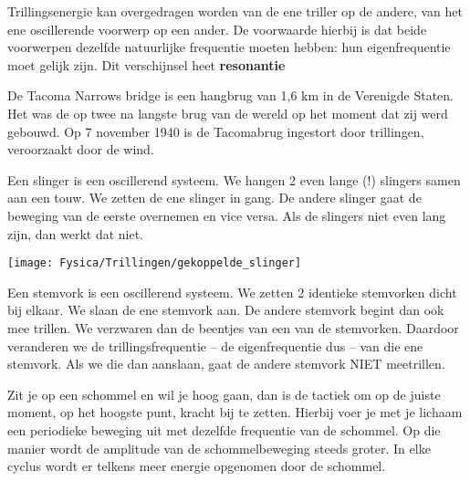 \documentclass{ximera}
\begin{document}
    \author{Ingmar Herreman}
    \date{Maart 2024}


\begin{definition}
Trillingsenergie kan overgedragen worden van de ene triller op de andere, van het ene oscillerende voorwerp op een ander. De voorwaarde hierbij is dat beide voorwerpen dezelfde natuurlijke frequentie moeten hebben: hun eigenfrequentie moet gelijk zijn. Dit verschijnsel heet \textbf{resonantie}
\end{definition}

\begin{example} 
De Tacoma Narrows bridge is een hangbrug van 1,6 km in de Verenigde Staten. Het was de op twee na langste brug van de wereld op het moment dat zij werd gebouwd. Op 7 november 1940 is de Tacomabrug ingestort door trillingen, veroorzaakt door de wind.
\begin{center}
\end{center}
\end{example}

\begin{example} 
Een slinger is een oscillerend systeem. We hangen 2 even lange (!) slingers samen aan een touw.
We zetten de ene slinger in gang. De andere slinger gaat de beweging van de eerste overnemen en vice versa. Als de slingers niet even lang zijn, dan werkt dat niet.
\begin{image}
    \texttt{[image: Fysica/Trillingen/gekoppelde\_slinger]}
\end{image}
\end{example}

\begin{example}[Stemvorken] 
Een stemvork is een oscillerend systeem. We zetten 2 identieke stemvorken dicht bij elkaar. We slaan de ene stemvork aan. De andere stemvork begint dan ook mee trillen.
We verzwaren dan de beentjes van een van de stemvorken. Daardoor veranderen we de trillingsfrequentie – de eigenfrequentie dus – van die ene stemvork. Als we die dan aanslaan, gaat de andere stemvork NIET meetrillen.   
\begin{center}
\end{center}
\end{example}

\begin{example}[Schommelen] 
    Zit je op een schommel en wil je hoog gaan, dan is de tactiek om op de juiste moment, op het hoogste punt, kracht bij te zetten. Hierbij voer je met je lichaam een periodieke beweging uit met dezelfde frequentie van de schommel. Op die manier wordt de amplitude van de schommelbeweging steeds groter. In elke cyclus wordt er telkens meer energie opgenomen door de schommel.
\end{example}
\end{document}
